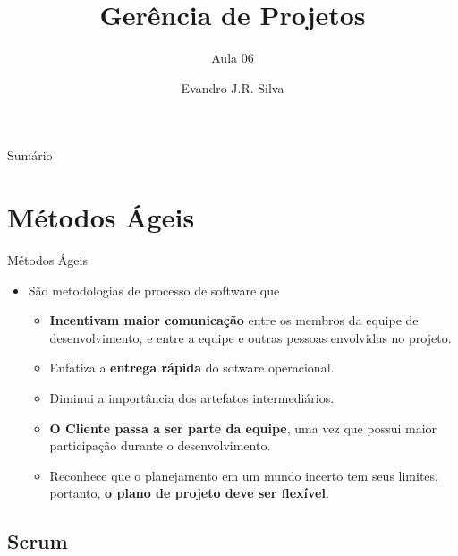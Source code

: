 \documentclass{beamer}
\title[GP 06]{Gerência de Projetos}
\subtitle{Aula 06}
\author[E.J.R. Silva]{Evandro J.R. Silva}
\date{}
\begin{document}
    
\begin{frame}
    \titlepage
\end{frame}

\begin{frame}{Sumário}
    \tableofcontents
\end{frame}

\section{Métodos Ágeis}

\begin{frame}{Métodos Ágeis}
    \begin{itemize}
        \justifying
        \item São metodologias de processo de software que
        	\begin{itemize}
        		\justifying 
        		\item \textbf{Incentivam maior comunicação} entre os membros da equipe de desenvolvimento, e entre a equipe e outras pessoas envolvidas no projeto.
        		\item Enfatiza a \textbf{entrega rápida} do sotware operacional.
        		\item Diminui a importância dos artefatos intermediários.
        		\item \textbf{O Cliente passa a ser parte da equipe}, uma vez que possui maior participação durante o desenvolvimento.
        		\item Reconhece que o planejamento em um mundo incerto tem seus limites, portanto, \textbf{o plano de projeto deve ser flexível}.
        	\end{itemize}
    \end{itemize}
\end{frame}

\subsection{Scrum}
\end{document}
